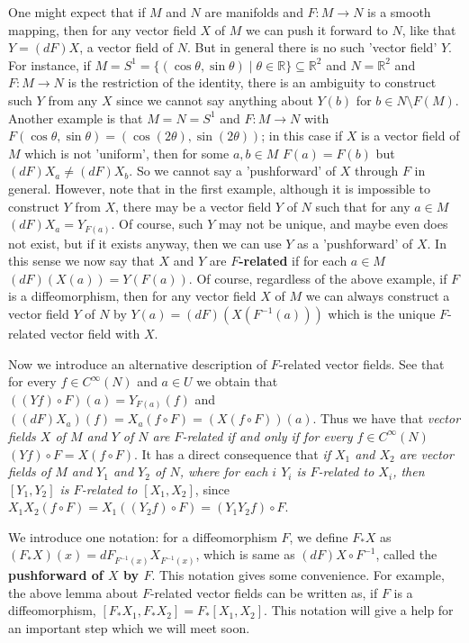 \documentclass{article}
\newcommand{\ReR}{\mathbb{R}}
\newcommand{\SBar}{\;|\;}
\begin{document}
One might expect that if $M$ and $N$ are manifolds and $F : M \to N$ is a smooth mapping, then for any vector field $X$ of $M$ we can push it forward to $N$, like that $Y = (dF)X$, a vector field of $N$.
But in general there is no such 'vector field' $Y$.
For instance, if $M = S^1 = \{(\cos{\theta}, \sin{\theta}) \SBar \theta \in \ReR\} \subseteq \ReR^2$ and $N = \ReR^2$ and $F : M \to N$ is the restriction of the identity, there is an ambiguity to construct such $Y$ from any $X$ since we cannot say anything about $Y(b)$ for $b \in N \setminus F(M)$.
Another example is that $M = N = S^1$ and $F : M \to N$ with $F(\cos{\theta}, \sin{\theta}) = (\cos{(2\theta)}, \sin{(2\theta)})$; in this case if $X$ is a vector field of $M$ which is not 'uniform', then for some $a, b \in M$ $F(a) = F(b)$ but $(dF)X_a \ne (dF)X_b$.
So we cannot say a 'pushforward' of $X$ through $F$ in general.
However, note that in the first example, although it is impossible to construct $Y$ from $X$, there may be a vector field $Y$ of $N$ such that for any $a \in M$ $(dF)X_a = Y_{F(a)}$.
Of course, such $Y$ may not be unique, and maybe even does not exist, but if it exists anyway, then we can use $Y$ as a 'pushforward' of $X$.
In this sense we now say that $X$ and $Y$ are \textbf{$F$-related} if for each $a \in M$ $(dF)(X(a)) = Y(F(a))$.
Of course, regardless of the above example, if $F$ is a diffeomorphism, then for any vector field $X$ of $M$ we can always construct a vector field $Y$ of $N$ by $Y(a) = (dF)(X(F^{-1}(a)))$ which is the unique $F$-related vector field with $X$.

Now we introduce an alternative description of $F$-related vector fields.
See that for every $f \in C^\infty(N)$ and $a \in U$ we obtain that $((Yf) \circ F)(a) = Y_{F(a)}(f)$ and $((dF) X_a)(f) = X_a(f \circ F) = (X(f \circ F))(a)$.
Thus we have that \textit{vector fields $X$ of $M$ and $Y$ of $N$ are $F$-related if and only if for every $f \in C^\infty(N)$ $(Yf) \circ F = X(f \circ F)$}.
It has a direct consequence that \textit{if $X_1$ and $X_2$ are vector fields of $M$ and $Y_1$ and $Y_2$ of $N$, where for each $i$ $Y_i$ is $F$-related to $X_i$, then $[Y_1, Y_2]$ is $F$-related to $[X_1, X_2]$}, since $X_1 X_2(f \circ F) = X_1 ((Y_2 f) \circ F) = (Y_1 Y_2 f) \circ F$.

We introduce one notation: for a diffeomorphism $F$, we define $F_* X$ as $(F_* X)(x) = dF_{F^{-1} (x)} X_{F^{-1}(x)}$, which is same as $(dF) X \circ F^{-1}$, called the \textbf{pushforward of $X$ by $F$}.
This notation gives some convenience.
For example, the above lemma about $F$-related vector fields can be written as, if $F$ is a diffeomorphism, $[F_* X_1, F_* X_2] = F_* [X_1, X_2]$.
This notation will give a help for an important step which we will meet soon.
\end{document}
